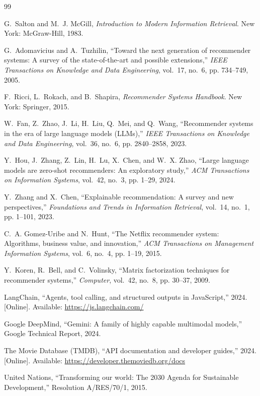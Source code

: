 \documentclass[11pt,a4paper]{article}
\begin{document}
\begin{thebibliography}{99}

G.~Salton and M.~J. McGill, \emph{Introduction to Modern Information Retrieval}. New York: McGraw-Hill, 1983.

G.~Adomavicius and A.~Tuzhilin, ``Toward the next generation of recommender systems: A survey of the state-of-the-art and possible extensions,'' \emph{IEEE Transactions on Knowledge and Data Engineering}, vol.~17, no.~6, pp. 734--749, 2005.

F.~Ricci, L.~Rokach, and B.~Shapira, \emph{Recommender Systems Handbook}. New York: Springer, 2015.

W.~Fan, Z.~Zhao, J.~Li, H.~Liu, Q.~Mei, and Q.~Wang, ``Recommender systems in the era of large language models (LLMs),'' \emph{IEEE Transactions on Knowledge and Data Engineering}, vol.~36, no.~6, pp. 2840--2858, 2023.

Y.~Hou, J.~Zhang, Z.~Lin, H.~Lu, X.~Chen, and W.~X. Zhao, ``Large language models are zero-shot recommenders: An exploratory study,'' \emph{ACM Transactions on Information Systems}, vol.~42, no.~3, pp. 1--29, 2024.

Y.~Zhang and X.~Chen, ``Explainable recommendation: A survey and new perspectives,'' \emph{Foundations and Trends in Information Retrieval}, vol.~14, no.~1, pp. 1--101, 2023.

C.~A. Gomez-Uribe and N.~Hunt, ``The Netflix recommender system: Algorithms, business value, and innovation,'' \emph{ACM Transactions on Management Information Systems}, vol.~6, no.~4, pp. 1--19, 2015.

Y.~Koren, R.~Bell, and C.~Volinsky, ``Matrix factorization techniques for recommender systems,'' \emph{Computer}, vol.~42, no.~8, pp. 30--37, 2009.

LangChain, ``Agents, tool calling, and structured outputs in JavaScript,'' 2024. [Online]. Available: \url{https://js.langchain.com/}

Google DeepMind, ``Gemini: A family of highly capable multimodal models,'' Google Technical Report, 2024.

The Movie Database (TMDB), ``API documentation and developer guides,'' 2024. [Online]. Available: \url{https://developer.themoviedb.org/docs}

United Nations, ``Transforming our world: The 2030 Agenda for Sustainable Development,'' Resolution A/RES/70/1, 2015.

\end{thebibliography}
\end{document}
